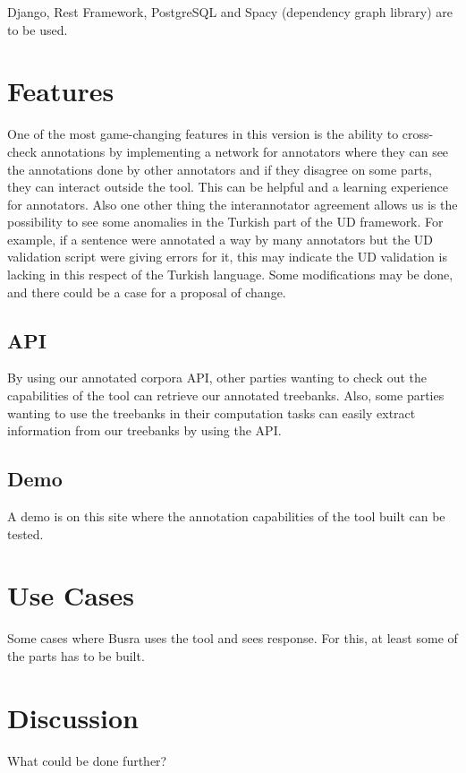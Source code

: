\documentclass[
]{ceurart}
\begin{document}
Django, Rest Framework, PostgreSQL and Spacy (dependency graph library) are to be used.

\section{Features}

One of the most game-changing features in this version is the ability to cross-check annotations by implementing a network for annotators where they can see the annotations done by other annotators and if they disagree on some parts, they can interact outside the tool. This can be helpful and a learning experience for annotators.
Also one other thing the interannotator agreement allows us is the possibility to see some anomalies in the Turkish part of the UD framework. For example, if a sentence were annotated a way by many annotators but the UD validation script were giving errors for it, this may indicate the UD validation is lacking in this respect of the Turkish language. Some modifications may be done, and there could be a case for a proposal of change.

\subsection{API}

By using our annotated corpora API, other parties wanting to check out the capabilities of the tool can retrieve our annotated treebanks. Also, some parties wanting to use the treebanks in their computation tasks can easily extract information from our treebanks by using the API.

\subsection{Demo}

A demo is on this site where the annotation capabilities of the tool built can be tested.

\section{Use Cases}

Some cases where Busra uses the tool and sees response. For this, at least some of the parts has to be built.

\section{Discussion}

What could be done further?


\end{document}
